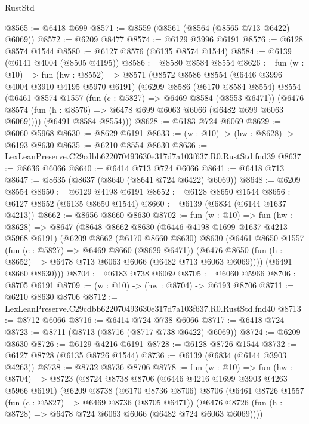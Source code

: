 \begin{lexlean}{RustStd}
\begin{coremodule}
@8565 := @6418 @699
@8571 := @8559 (@8561 (@8564 (@8565 @713 @6422) @6069))
@8572 := @6209 @8477
@8574 := @6129 @3996 @6191
@8576 := @6128 @8574 @1544
@8580 := @6127 @8576 (@6135 @8574 @1544)
@8584 := @6139 (@6141 @4004 (@8505 @4195))
@8586 := @8580 @8584 @8554
@8626 := fun (w : @10) =>
  fun (hw : @8552) =>
  @8571
    (@8572
      @8586
      @8554
      (@6446 @3996 @4004 @3910 @4195 @5970 @6191)
      (@6209
        @8586
        (@6170 @8584 @8554)
        @8554
        (@6461
          @8574
          @1557
          (fun (c : @5827) => @6469 @8584 (@8553 @6471))
          (@6476 @8574 (fun (h : @8576) => @6478 @699 @6063 @6066 (@6482 @699 @6063 @6069))))
        (@6491 @8584 @8554)))
@8628 := @6183 @724 @6069
@8629 := @6060 @5968
@8630 := @8629 @6191
@8633 := (w : @10) -> (hw : @8628) -> @6193 @8630
@8635 := @6210 @8554 @8630
@8636 := LexLeanPreserve.C29cdbb622070493630e317d7a103f637.R0.RustStd.fnd39
@8637 := @8636 @6066
@8640 := @6414 @713 @724 @6066
@8641 := @6418 @713
@8647 := @8635 (@8637 (@8640 (@8641 @724 @6422) @6069))
@8648 := @6209 @8554
@8650 := @6129 @4198 @6191
@8652 := @6128 @8650 @1544
@8656 := @6127 @8652 (@6135 @8650 @1544)
@8660 := @6139 (@6834 (@6144 @1637 @4213))
@8662 := @8656 @8660 @8630
@8702 := fun (w : @10) =>
  fun (hw : @8628) =>
  @8647
    (@8648
      @8662
      @8630
      (@6446 @4198 @1699 @1637 @4213 @5968 @6191)
      (@6209
        @8662
        (@6170 @8660 @8630)
        @8630
        (@6461
          @8650
          @1557
          (fun (c : @5827) => @6469 @8660 (@8629 @6471))
          (@6476 @8650 (fun (h : @8652) => @6478 @713 @6063 @6066 (@6482 @713 @6063 @6069))))
        (@6491 @8660 @8630)))
@8704 := @6183 @738 @6069
@8705 := @6060 @5966
@8706 := @8705 @6191
@8709 := (w : @10) -> (hw : @8704) -> @6193 @8706
@8711 := @6210 @8630 @8706
@8712 := LexLeanPreserve.C29cdbb622070493630e317d7a103f637.R0.RustStd.fnd40
@8713 := @8712 @6066
@8716 := @6414 @724 @738 @6066
@8717 := @6418 @724
@8723 := @8711 (@8713 (@8716 (@8717 @738 @6422) @6069))
@8724 := @6209 @8630
@8726 := @6129 @4216 @6191
@8728 := @6128 @8726 @1544
@8732 := @6127 @8728 (@6135 @8726 @1544)
@8736 := @6139 (@6834 (@6144 @3903 @4263))
@8738 := @8732 @8736 @8706
@8778 := fun (w : @10) =>
  fun (hw : @8704) =>
  @8723
    (@8724
      @8738
      @8706
      (@6446 @4216 @1699 @3903 @4263 @5966 @6191)
      (@6209
        @8738
        (@6170 @8736 @8706)
        @8706
        (@6461
          @8726
          @1557
          (fun (c : @5827) => @6469 @8736 (@8705 @6471))
          (@6476 @8726 (fun (h : @8728) => @6478 @724 @6063 @6066 (@6482 @724 @6063 @6069))))

\end{coremodule}
\end{lexlean}

